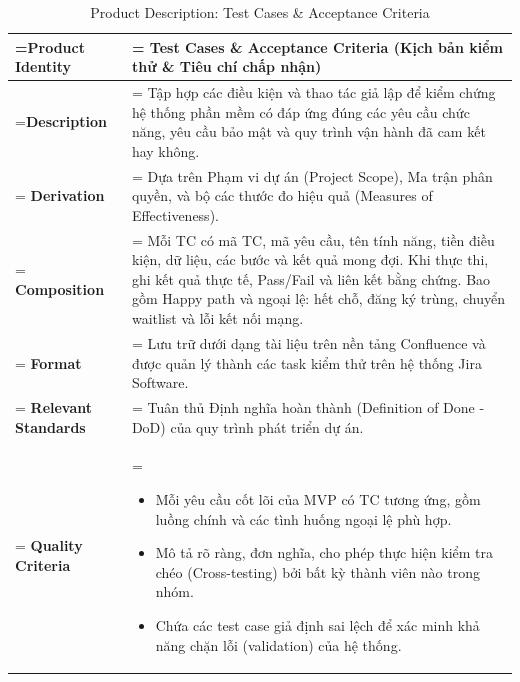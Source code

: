 \documentclass{article}
\begin{document}
\clearpage
\begin{table}[H]
    \centering
    \caption{Product Description: Test Cases \& Acceptance Criteria}
    \renewcommand{\arraystretch}{1.5}
    \begin{tabularx}{\textwidth}{|>{\hsize=0.5\hsize\linewidth=\hsize\bfseries}X|>{\hsize=1.5\hsize\linewidth=\hsize}X|}
        \hline
        Product Identity & \textbf{Test Cases \& Acceptance Criteria} (Kịch bản kiểm thử \& Tiêu chí chấp nhận) \\
        \hline
        Description & Tập hợp các điều kiện và thao tác giả lập để kiểm chứng hệ thống phần mềm có đáp ứng đúng các yêu cầu chức năng, yêu cầu bảo mật và quy trình vận hành đã cam kết hay không. \\
        \hline
        Derivation & Dựa trên Phạm vi dự án (Project Scope), Ma trận phân quyền, và bộ các thước đo hiệu quả (Measures of Effectiveness). \\
        \hline
        Composition & Mỗi TC có mã TC, mã yêu cầu, tên tính năng, tiền điều kiện, dữ liệu, các bước và kết quả mong đợi. Khi thực thi, ghi kết quả thực tế, Pass/Fail và liên kết bằng chứng. Bao gồm Happy path và ngoại lệ: hết chỗ, đăng ký trùng, chuyển waitlist và lỗi kết nối mạng. \\
        \hline
        Format & Lưu trữ dưới dạng tài liệu trên nền tảng Confluence và được quản lý thành các task kiểm thử trên hệ thống Jira Software. \\
        \hline
        Relevant Standards & Tuân thủ Định nghĩa hoàn thành (Definition of Done - DoD) của quy trình phát triển dự án. \\
        \hline
        Quality Criteria & 
        \vspace{-0.8em}
        \begin{itemize}[leftmargin=*, nosep]
            \item Mỗi yêu cầu cốt lõi của MVP có TC tương ứng, gồm luồng chính và các tình huống ngoại lệ phù hợp.
            \item Mô tả rõ ràng, đơn nghĩa, cho phép thực hiện kiểm tra chéo (Cross-testing) bởi bất kỳ thành viên nào trong nhóm.
            \item Chứa các test case giả định sai lệch để xác minh khả năng chặn lỗi (validation) của hệ thống.
        \end{itemize}
        \vspace{-1em} \\
        \hline
    \end{tabularx}
\end{table}
\end{document}
